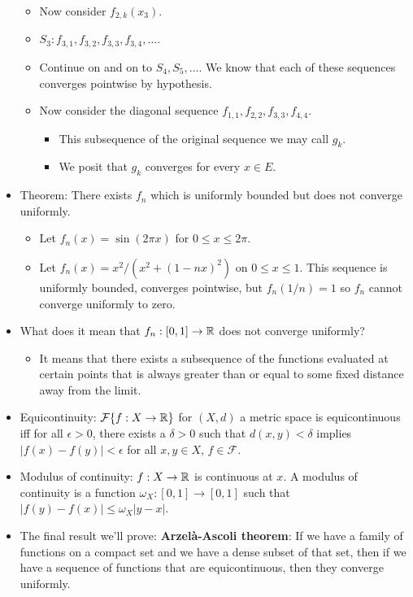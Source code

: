 \documentclass[../../notes.tex]{subfiles}
\begin{document}
\begin{itemize}
\begin{itemize}
        \item Now consider $f_{2,k}(x_3)$.
        \item $S_3:f_{3,1},f_{3,2},f_{3,3},f_{3,4},\dots$.
        \item Continue on and on to $S_4,S_5,\dots$. We know that each of these sequences converges pointwise by hypothesis.
        \item Now consider the diagonal sequence $f_{1,1},f_{2,2},f_{3,3},f_{4,4}$.
        \begin{itemize}
            \item This subsequence of the original sequence we may call $g_k$.
            \item We posit that $g_k$ converges for every $x\in E$. 
        \end{itemize}
    \end{itemize}
    \item Theorem: There exists $f_n$ which is uniformly bounded but does not converge uniformly.
    \begin{itemize}
        \item Let $f_n(x)=\sin(2\pi x)$ for $0\leq x\leq 2\pi$.
        \item Let $f_n(x)=x^2/(x^2+(1-nx)^2)$ on $0\leq x\leq 1$. This sequence is uniformly bounded, converges pointwise, but $f_n(1/n)=1$ so $f_n$ cannot converge uniformly to zero.
    \end{itemize}
    \item What does it mean that $f_n:[0,1]\to\mathbb{R}$ does not converge uniformly?
    \begin{itemize}
        \item It means that there exists a subsequence of the functions evaluated at certain points that is always greater than or equal to some fixed distance away from the limit.
    \end{itemize}
    \item Equicontinuity: $\mathcal{F}\{f:X\to\mathbb{R}\}$ for $(X,d)$ a metric space is equicontinuous iff for all $\epsilon>0$, there exists a $\delta>0$ such that $d(x,y)<\delta$ implies $|f(x)-f(y)|<\epsilon$ for all $x,y\in X$, $f\in\mathcal{F}$.
    \item Modulus of continuity: $f:X\to\mathbb{R}$ is continuous at $x$. A modulus of continuity is a function $\omega_X:[0,1]\to[0,1]$ such that $|f(y)-f(x)|\leq\omega_X|y-x|$.
    \item The final result we'll prove: \textbf{Arzel\`{a}-Ascoli theorem}: If we have a family of functions on a compact set and we have a dense subset of that set, then if we have a sequence of functions that are equicontinuous, then they converge uniformly.
\end{itemize}
\end{document}
